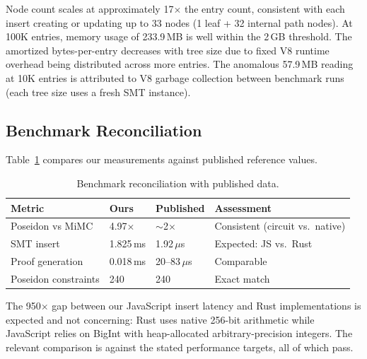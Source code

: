Node count scales at approximately 17$\times$ the entry count, consistent with each insert creating or updating up to 33 nodes (1 leaf + 32 internal path nodes). At 100K entries, memory usage of 233.9\,MB is well within the 2\,GB threshold. The amortized bytes-per-entry decreases with tree size due to fixed V8 runtime overhead being distributed across more entries. The anomalous 57.9\,MB reading at 10K entries is attributed to V8 garbage collection between benchmark runs (each tree size uses a fresh SMT instance).

\subsection{Benchmark Reconciliation}

Table~\ref{tab:reconciliation} compares our measurements against published reference values.

\begin{table}[htbp]
\centering
\caption{Benchmark reconciliation with published data.}
\label{tab:reconciliation}
\begin{tabular}{lllp{3.5cm}}
\hline
\textbf{Metric} & \textbf{Ours} & \textbf{Published} & \textbf{Assessment} \\
\hline
Poseidon vs MiMC & 4.97$\times$ & $\sim$2$\times$~\cite{semaphore2024v4} & Consistent (circuit vs.\ native) \\
SMT insert & 1.825\,ms & 1.92\,$\mu$s~\cite{reilabs2024largesmt} & Expected: JS vs.\ Rust \\
Proof generation & 0.018\,ms & 20--83\,$\mu$s~\cite{reilabs2024largesmt} & Comparable \\
Poseidon constraints & 240 & 240~\cite{guohanze2024benchmarking} & Exact match \\
\hline
\end{tabular}
\end{table}

The 950$\times$ gap between our JavaScript insert latency and Rust implementations is expected and not concerning: Rust uses native 256-bit arithmetic while JavaScript relies on BigInt with heap-allocated arbitrary-precision integers. The relevant comparison is against the stated performance targets, all of which pass.
